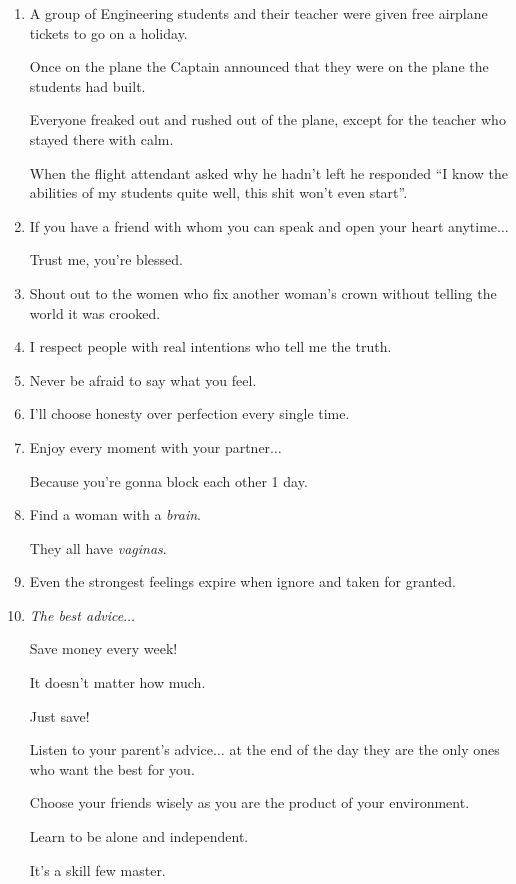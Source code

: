 \documentclass{article}
\numberwithin{equation}{section}
\begin{document}
\begin{enumerate}
    Being raised right is how you treat people, your manners and respect.
    \item A group of Engineering students and their teacher were given free airplane tickets to go on a holiday.
    
    Once on the plane the Captain announced that they were on the plane the students had built.
    
    Everyone freaked out and rushed out of the plane, except for the teacher who stayed there with calm.
    
    When the flight attendant asked why he hadn't left he responded ``I know the abilities of my students quite well, this shit won't even start''.
    \item If you have a friend with whom you can speak and open your heart anytime$\ldots$
    
    Trust me, you're blessed.
    \item Shout out to the women who fix another woman's crown without telling the world it was crooked.
    \item I respect people with real intentions who tell me the truth.
    \item Never be afraid to say what you feel.
    \item I'll choose honesty over perfection every single time.
    \item Enjoy every moment with your partner$\ldots$
    
    Because you're gonna block each other 1 day.
    \item Find a woman with a \textit{brain}.
    
    They all have \textit{vaginas}.
    \item Even the strongest feelings expire when ignore and taken for granted.
    \item \textit{The best advice}$\ldots$
    
    Save money every week!
    
    It doesn't matter how much.
    
    Just save!
    
    Listen to your parent's advice$\ldots$ at the end of the day they are the only ones who want the best for you.
    
    Choose your friends wisely as you are the product of your environment.
    
    Learn to be alone and independent.
    
    It's a skill few master.
    

\end{enumerate}
\end{document}
